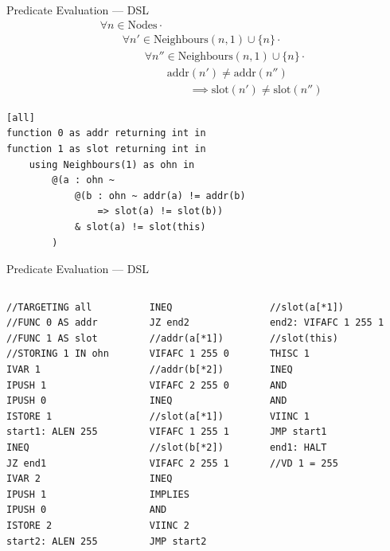 \documentclass[usenames,dvipsnames]{beamer}
\begin{document}
\begin{frame}[fragile]{Predicate Evaluation --- DSL}
\begin{align*}
&				\forall n \in \text{Nodes} \cdot \\
& \hspace{2em}		\forall n' \in \text{Neighbours}(n, 1) \cup \{n\} \cdot \\
& \hspace{4em}			\forall n'' \in \text{Neighbours}(n, 1) \cup \{n\} \cdot \\
& \hspace{6em}				\text{addr}(n') \not= \text{addr}(n'') \\
& \hspace{8em}					\implies \text{slot}(n') \neq \text{slot}(n'')
\end{align*}

\begin{center}
\begin{minipage}{0.75\textwidth}
\begin{lstlisting}[language=Hoppy]
[all]
function 0 as addr returning int in
function 1 as slot returning int in
    using Neighbours(1) as ohn in
        @(a : ohn ~
            @(b : ohn ~ addr(a) != addr(b)
                => slot(a) != slot(b))
            & slot(a) != slot(this)
        )
\end{lstlisting}
\end{minipage}
\end{center}
\end{frame}

\begin{frame}[fragile]{Predicate Evaluation --- DSL}
\begin{columns}[t]
	\begin{column}[T]{3.1cm}
\begin{lstlisting}[language=Dragon]
//TARGETING all
//FUNC 0 AS addr
//FUNC 1 AS slot
//STORING 1 IN ohn
IVAR 1
IPUSH 1
IPUSH 0
ISTORE 1
start1: ALEN 255
INEQ
JZ end1
IVAR 2
IPUSH 1
IPUSH 0
ISTORE 2
start2: ALEN 255
\end{lstlisting}
	\end{column}
	\begin{column}[T]{2.6cm}
\begin{lstlisting}[language=Dragon]
INEQ
JZ end2
//addr(a[*1])
VIFAFC 1 255 0
//addr(b[*2])
VIFAFC 2 255 0
INEQ
//slot(a[*1])
VIFAFC 1 255 1
//slot(b[*2])
VIFAFC 2 255 1
INEQ
IMPLIES
AND
VIINC 2
JMP start2
\end{lstlisting}
	\end{column}
\begin{column}[T]{3.4cm}
\begin{lstlisting}[language=Dragon]
//slot(a[*1])
end2: VIFAFC 1 255 1
//slot(this)
THISC 1
INEQ
AND
AND
VIINC 1
JMP start1
end1: HALT
//VD 1 = 255
\end{lstlisting}
	\end{column}
	\end{columns}

\end{frame}
\end{document}
